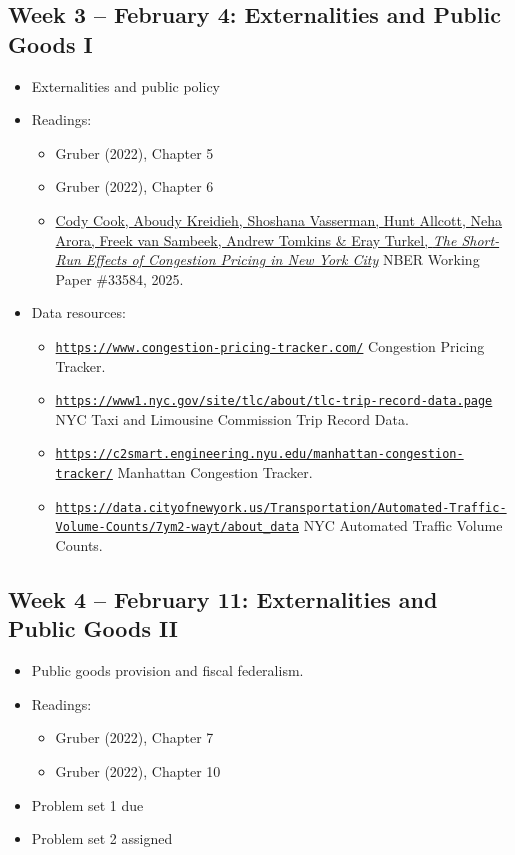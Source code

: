 \documentclass[11pt]{article}
\begin{document}
\subsection*{Week 3 -- February 4: Externalities and Public Goods I}
\begin{itemize}
    \setlength{\itemsep}{0em}
    \item Externalities and public policy
    \item Readings:
    \begin{itemize}
        \item Gruber (2022), Chapter 5
        \item Gruber (2022), Chapter 6
        \item \href{https://www.nber.org/papers/w33584}{Cody Cook, Aboudy Kreidieh, Shoshana Vasserman, Hunt Allcott, Neha Arora, Freek van Sambeek, Andrew Tomkins \& Eray Turkel, \textit{The Short-Run Effects of Congestion Pricing in New York City}} NBER Working Paper \#33584, 2025.
    \end{itemize}
    \item Data resources:
    \begin{itemize}
    \setlength{\itemsep}{0em}
        \item \href{https://www.congestion-pricing-tracker.com/}{\nolinkurl{https://www.congestion-pricing-tracker.com/}} Congestion Pricing Tracker.
        \item \href{https://www1.nyc.gov/site/tlc/about/tlc-trip-record-data.page}{\nolinkurl{https://www1.nyc.gov/site/tlc/about/tlc-trip-record-data.page}} NYC Taxi and Limousine Commission Trip Record Data.
        \item \href{https://c2smart.engineering.nyu.edu/manhattan-congestion-tracker/}{\nolinkurl{https://c2smart.engineering.nyu.edu/manhattan-congestion-tracker/}} Manhattan Congestion Tracker.
        \item \href{https://data.cityofnewyork.us/Transportation/Automated-Traffic-Volume-Counts/7ym2-wayt/about_data}{\nolinkurl{https://data.cityofnewyork.us/Transportation/Automated-Traffic-Volume-Counts/7ym2-wayt/about_data}} NYC Automated Traffic Volume Counts.
    \end{itemize} 
\end{itemize}

\subsection*{Week 4 -- February 11: Externalities and Public Goods II}
\begin{itemize}
    \setlength{\itemsep}{0em}
    \item Public goods provision and fiscal federalism.
    \item Readings:
    \begin{itemize}
        \item Gruber (2022), Chapter 7
        \item Gruber (2022), Chapter 10
    \end{itemize}
    \item Problem set 1 due
    \item Problem set 2 assigned
\end{itemize}
\end{document}
